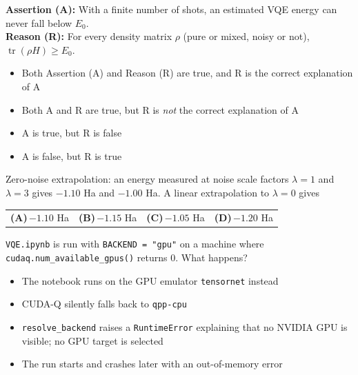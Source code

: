 \documentclass[11pt,a4paper]{article}
\newcommand{\optlabel}[1]{\textbf{(#1)}}
\newenvironment{qitem}[1]{\begin{list}{}{\setlength{\leftmargin}{3.3em}\setlength{\labelwidth}{3.1em}%
  \setlength{\labelsep}{0.2em}\setlength{\topsep}{3pt}\setlength{\parsep}{3pt}}\item[\textbf{Q.#1}\hfill]}{\end{list}}
\newcommand{\qsep}{\par\vspace{2pt}{\color{black!15}\hrule}\vspace{4pt}}
\begin{document}
\begin{qitem}{71}
\textbf{Assertion (A):} With a finite number of shots, an estimated VQE energy can never fall below $E_0$.\\[1mm]
\textbf{Reason (R):} For every density matrix $\rho$ (pure or mixed, noisy or not), $\operatorname{tr}(\rho H) \ge E_0$.
\begin{itemize}[leftmargin=2.6em, labelsep=0.4em, itemsep=2pt, topsep=3pt]
\item[\optlabel{A}] Both Assertion (A) and Reason (R) are true, and R is the correct explanation of A
\item[\optlabel{B}] Both A and R are true, but R is \emph{not} the correct explanation of A
\item[\optlabel{C}] A is true, but R is false
\item[\optlabel{D}] A is false, but R is true
\end{itemize}
\end{qitem}
\qsep

\begin{qitem}{72}
Zero-noise extrapolation: an energy measured at noise scale factors $\lambda = 1$ and $\lambda = 3$ gives $-1.10$ Ha and $-1.00$ Ha. A linear extrapolation to
$\lambda = 0$ gives
\par\smallskip\noindent\begin{tabularx}{\linewidth}{@{}*{4}{L}@{}}
\optlabel{A}\,$-1.10$ Ha & \optlabel{B}\,$-1.15$ Ha & \optlabel{C}\,$-1.05$ Ha & \optlabel{D}\,$-1.20$ Ha
\end{tabularx}
\end{qitem}
\qsep

\begin{qitem}{73}
\texttt{VQE.ipynb} is run with \texttt{BACKEND = "gpu"} on a machine where \texttt{cudaq.num\_available\_gpus()} returns 0. What happens?
\begin{itemize}[leftmargin=2.6em, labelsep=0.4em, itemsep=2pt, topsep=3pt]
\item[\optlabel{A}] The notebook runs on the GPU emulator \texttt{tensornet} instead
\item[\optlabel{B}] CUDA-Q silently falls back to \texttt{qpp-cpu}
\item[\optlabel{C}] \texttt{resolve\_backend} raises a \texttt{RuntimeError} explaining that no NVIDIA GPU is visible; no GPU target is selected
\item[\optlabel{D}] The run starts and crashes later with an out-of-memory error
\end{itemize}
\end{qitem}
\qsep
\end{document}
